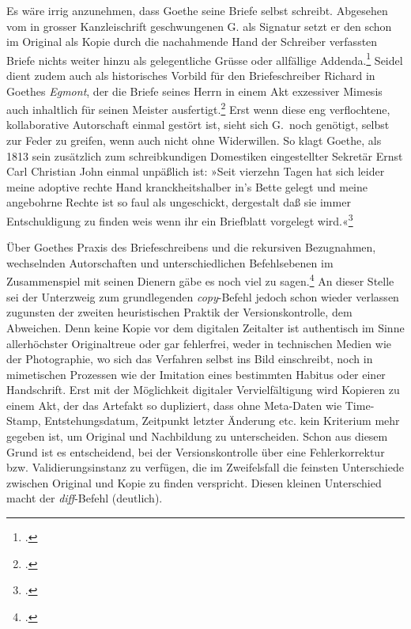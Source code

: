 \documentclass[a4paper,10pt]{article}
\newcommand{\anf}[1]{»#1«}
\begin{document}
Es wäre irrig anzunehmen, dass Goethe seine Briefe selbst schreibt. Abgesehen vom in grosser Kanzleischrift geschwungenen G. als Signatur setzt er den schon im Original als Kopie durch die nachahmende Hand der Schreiber verfassten Briefe nichts weiter hinzu als gelegentliche Grüsse oder allfällige Addenda.\footcite[40]{schleif:1965} Seidel dient zudem auch als historisches Vorbild für den Briefeschreiber Richard in Goethes \emph{Egmont}, der die Briefe seines Herrn in einem Akt exzessiver Mimesis auch inhaltlich für seinen Meister ausfertigt.\footcite[Vgl.][253–256]{krajewski:2010} Erst wenn diese eng verflochtene, kollaborative Autorschaft einmal gestört ist, sieht sich G.\ noch genötigt, selbst zur Feder zu greifen, wenn auch nicht ohne Widerwillen. So klagt Goethe, als 1813 sein zusätzlich zum schreibkundigen Domestiken eingestellter Sekretär Ernst Carl Christian John einmal unpäßlich ist: \anf{Seit vierzehn Tagen hat sich leider meine adoptive rechte Hand kranckheitshalber in's Bette gelegt und meine angebohrne Rechte ist so faul als ungeschickt, dergestalt daß sie immer Entschuldigung zu finden weis wenn ihr ein Briefblatt  vorgelegt wird.}\footcite[][Nachträge: Briefe, Bd.~51, S.~342]{goethe:1887}

Über Goethes Praxis des Briefeschreibens und die rekursiven Bezugnahmen, wechselnden Autorschaften und unterschiedlichen Befehlsebenen im Zusammenspiel mit seinen Dienern gäbe es noch viel zu sagen.\footcites[Vgl.][]{krajewski:2010}[sowie][]{schoene:2015} An dieser Stelle sei der Unterzweig zum grundlegenden \emph{copy}-Befehl jedoch schon wieder verlassen zugunsten der zweiten heuristischen Praktik der Versionskontrolle, dem Abweichen. Denn keine Kopie vor dem digitalen Zeitalter ist authentisch im Sinne allerhöchster Originaltreue oder gar fehlerfrei, weder in technischen Medien wie der Photographie, wo sich das Verfahren selbst ins Bild einschreibt, noch in mimetischen Prozessen wie der Imitation eines bestimmten Habitus oder einer Handschrift. Erst mit der Möglichkeit digitaler Vervielfältigung wird Kopieren zu einem Akt, der das Artefakt so dupliziert, dass ohne Meta-Daten wie Time-Stamp, Entstehungsdatum, Zeitpunkt letzter Änderung etc. kein Kriterium mehr gegeben ist, um Original und Nachbildung zu unterscheiden. Schon aus diesem Grund ist es entscheidend, bei der Versionskontrolle über eine Fehlerkorrektur bzw. Validierungsinstanz zu verfügen, die im Zweifelsfall die feinsten Unterschiede zwischen Original und Kopie zu finden verspricht. Diesen kleinen Unterschied macht der \emph{diff}-Befehl (deutlich).
\end{document}

